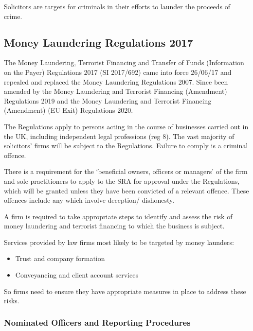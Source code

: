 \documentclass[
]{article}
\providecommand{\tightlist}{%
  \setlength{\itemsep}{0pt}\setlength{\parskip}{0pt}}
\begin{document}
Solicitors are targets for criminals in their efforts to launder the
proceeds of crime.

\hypertarget{money-laundering-regulations-2017}{%
\subsection{Money Laundering Regulations
2017}\label{money-laundering-regulations-2017}}

The Money Laundering, Terrorist Financing and Transfer of Funds
(Information on the Payer) Regulations 2017 (SI 2017/692) came into
force 26/06/17 and repealed and replaced the Money Laundering
Regulations 2007. Since been amended by the Money Laundering and
Terrorist Financing (Amendment) Regulations 2019 and the Money
Laundering and Terrorist Financing (Amendment) (EU Exit) Regulations
2020.

The Regulations apply to persons acting in the course of businesses
carried out in the UK, including independent legal professions (reg 8).
The vast majority of solicitors' firms will be subject to the
Regulations. Failure to comply is a criminal offence.

There is a requirement for the `beneficial owners, officers or managers'
of the firm and sole practitioners to apply to the SRA for approval
under the Regulations, which will be granted unless they have been
convicted of a relevant offence. These offences include any which
involve deception/ dishonesty.

A firm is required to take appropriate steps to identify and assess the
risk of money laundering and terrorist financing to which the business
is subject.

Services provided by law firms most likely to be targeted by money
launders:

\begin{itemize}
\tightlist
\item
  Trust and company formation
\item
  Conveyancing and client account services
\end{itemize}

So firms need to ensure they have appropriate measures in place to
address these risks.

\hypertarget{nominated-officers-and-reporting-procedures}{%
\subsubsection{Nominated Officers and Reporting
Procedures}\label{nominated-officers-and-reporting-procedures}}
\end{document}
